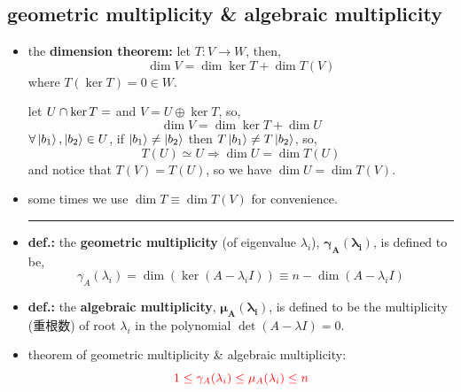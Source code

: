 \subsection{geometric multiplicity \& algebraic multiplicity}
\begin{itemize}
	\item the \textbf{dimension theorem:} let $T: V \rightarrow W$, then,
	\begin{equation}
		\dim V = \dim \ker T + \dim T(V)
	\end{equation}
	where $T (\ker T) = 0 \in W$.
	
	\begin{tcolorbox}[title=proof:]
		let $U \cap \ker T = \empty$ and $V = U \oplus \ker T$, so,
		\begin{equation}
			\dim V = \dim \ker T + \dim U
		\end{equation}
		$\forall \ket{b_1}, \ket{b_2} \in U$, if $\ket{b_1} \neq \ket{b_2}$ then $T \ket{b_1} \neq T \ket{b_2}$, so,
		\begin{equation}
			T(U) \simeq U \Longrightarrow \dim U = \dim T(U)
		\end{equation}
		and notice that $T(V) = T(U)$, so we have $\dim U = \dim T(V)$.
	\end{tcolorbox}
	
	\item some times we use $\dim T \equiv \dim T(V)$ for convenience.
	
	\noindent\rule[0.5ex]{\linewidth}{0.5pt} %
	
	\item \textbf{def.:} the \textbf{geometric multiplicity} (of eigenvalue $\lambda_i$), $\boldsymbol{\gamma_A(\lambda_i)}$, is defined to be,
	\begin{equation}
		\gamma_A(\lambda_i) = \dim(\ker(A - \lambda_i I)) \equiv n - \dim(A - \lambda_i I)
	\end{equation}
	
	\item \textbf{def.:} the \textbf{algebraic multiplicity}, $\boldsymbol{\mu_A(\lambda_i)}$, is defined to be the multiplicity (重根数) of root $\lambda_i$ in the polynomial $\det(A - \lambda I) = 0$.
	
	\item theorem of geometric multiplicity \& algebraic multiplicity:
	\begin{equation}
		\mathcolor{red}{1 \leq \gamma_A(\lambda_i) \leq \mu_A(\lambda_i) \leq n}
	\end{equation}
	

\end{itemize}
